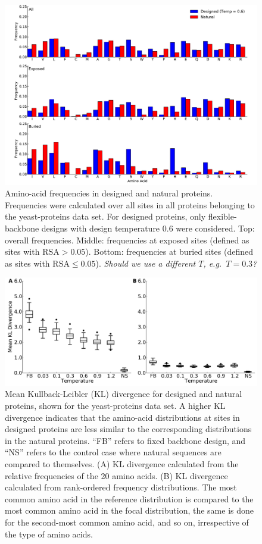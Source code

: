 \documentclass[12pt]{article}
\begin{document}
\begin{figure}[H]
\centerline{\includegraphics[width = 5in]{figures/Duncan_Freq_Combo_Plots_06.pdf}}
\caption{Amino-acid frequencies in designed and natural proteins. Frequencies were calculated over all sites in all proteins belonging to the yeast-proteins data set. For designed proteins, only flexible-backbone designs with design temperature 0.6 were considered. Top: overall frequencies. Middle: frequencies at exposed sites (defined as sites with $\text{RSA}>0.05$). Bottom: frequencies at buried sites (defined as sites with $\text{RSA}\leq0.05$). {\color{green}\emph{Should we use a different $T$, e.g.\ $T=0.3$?} }  }
\label{AAFreqsYeastProteins}
\end{figure}


\begin{figure}[H]
\centerline{\includegraphics[width = 6in]{figures/Mean_KL_vs_Temp_Boxplot.pdf}}
\caption{Mean Kullback-Leibler (KL) divergence for designed and natural proteins, shown for the yeast-proteins data set. A higher KL divergence indicates that the amino-acid distributions at sites in designed proteins are less similar to the corresponding distributions in the natural proteins. ``FB'' refers to fixed backbone design, and ``NS'' refers to the control case where natural sequences are compared to themselves. (A) KL divergence calculated from the relative frequencies of the 20 amino acids. (B) KL divergence calculated from rank-ordered frequency distributions. The most common amino acid in the reference distribution is compared to the most common amino acid in the focal distribution, the same is done for the second-most common amino acid, and so on, irrespective of the type of amino acids.}
\label{AADisFig1}
\end{figure}
\end{document}

